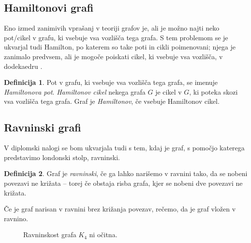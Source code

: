 \documentclass[12pt,a4paper]{amsart}
\theoremstyle{definition} %
\newtheorem{definicija}{Definicija}[section]
\theoremstyle{plain} %
\begin{document}
\subsection{Hamiltonovi grafi}

Eno izmed zanimivih vprašanj v teoriji grafov je, ali je možno najti neko pot/cikel v grafu, ki vsebuje vsa vozlišča tega grafa. S tem problemom se je ukvarjal tudi Hamilton, po katerem so take poti in cikli poimenovani; njega je zanimalo predvsem, ali je mogoče poiskati cikel, ki vsebuje vsa vozlišča, v dodekaedru \cite{bib:wikihamilpath}.

\begin{definicija}
	Pot v grafu, ki vsebuje vsa vozlišča tega grafa, se imenuje \emph{Hamiltonova pot}.
	\emph{Hamiltonov cikel} nekega grafa $G$ je cikel v $G$, ki poteka skozi vsa vozlišča tega grafa.
	Graf je \emph{Hamiltonov}, če vsebuje Hamiltonov cikel.
\end{definicija}

\subsection{Ravninski grafi}

V diplomski nalogi se bom ukvarjala tudi s tem, kdaj je graf, s pomočjo katerega predstavimo londonski stolp, ravninski.

\begin{definicija}
    Graf je \emph{ravninski}, če ga lahko narišemo v ravnini tako, da se nobeni povezavi ne križata -- torej če obstaja risba grafa, kjer se nobeni dve povezavi ne križata.
\end{definicija}

Če je graf narisan v ravnini brez križanja povezav, rečemo, da je graf vložen v ravnino.

\begin{figure}[h]

    \caption{Ravninskost grafa $K_4$ ni očitna.}
\end{figure}
\end{document}
